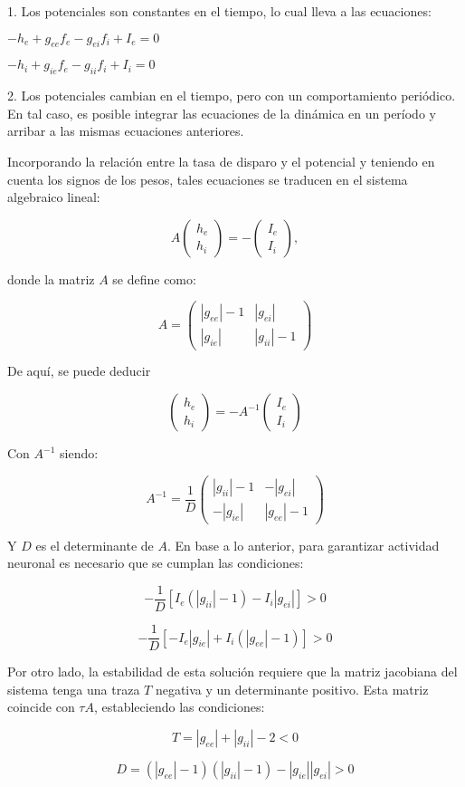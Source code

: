 \documentclass[aps,prb,twocolumn,superscriptaddress,floatfix,longbibliography]{revtex4-2}
\newcounter{para}
\begin{document}
1. Los potenciales son constantes en el tiempo, lo cual lleva a las ecuaciones:
    
    \(-h_e + g_{ee} f_e - g_{ei} f_i + I_e = 0\)
    
    \(-h_i + g_{ie} f_e - g_{ii} f_i + I_i = 0\)
    
2. Los potenciales cambian en el tiempo, pero con un comportamiento periódico. En tal caso, es posible integrar las ecuaciones de la dinámica en un período y arribar a las mismas ecuaciones anteriores.

Incorporando la relación entre la tasa de disparo y el potencial y teniendo en cuenta los signos de los pesos, tales ecuaciones se traducen en el sistema algebraico lineal:

\[ A \begin{pmatrix} h_e \\ h_i \end{pmatrix} = - \begin{pmatrix} I_e \\ I_i \end{pmatrix}, \]

donde la matriz \(A\) se define como:

\[ A = \begin{pmatrix} |g_{ee}| - 1 & |g_{ei}| \\ |g_{ie}| & |g_{ii}| - 1 \end{pmatrix} \]

De aquí, se puede deducir

\[ \begin{pmatrix} h_e \\ h_i \end{pmatrix} = - A^{-1} \begin{pmatrix} I_e \\ I_i \end{pmatrix} \]

Con \(A^{-1}\) siendo:

\[ A^{-1} = \frac{1}{D} \begin{pmatrix} |g_{ii}| - 1 & -|g_{ei}| \\ -|g_{ie}| & |g_{ee}| - 1 \end{pmatrix} \]

Y \(D\) es el determinante de \(A\). En base a lo anterior, para garantizar actividad neuronal es necesario que se cumplan las condiciones:

\[ -\frac{1}{D} [ I_e (|g_{ii}| - 1) - I_i |g_{ei}| ] > 0 \]

\[ -\frac{1}{D} [ -I_e |g_{ie}| + I_i (|g_{ee}| - 1) ] > 0 \]

Por otro lado, la estabilidad de esta solución requiere que la matriz jacobiana del sistema tenga una traza \(T\) negativa y un determinante positivo. Esta matriz coincide con \(\tau A\), estableciendo las condiciones:

\[ T = |g_{ee}| + |g_{ii}| - 2 < 0 \]

\[ D = (|g_{ee}| - 1)(|g_{ii}| - 1) - |g_{ie}||g_{ei}| > 0 \]




\end{document}
